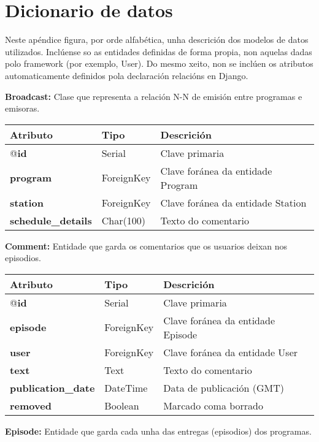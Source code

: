 \chapter[Apéndice: Dicionario de datos]{
  \label{chp:dicionario}
  Dicionario de datos
}
Neste apéndice figura, por orde alfabética, unha descrición dos modelos de datos utilizados. Inclúense so as entidades definidas de forma propia, non aquelas dadas polo framework (por exemplo, User). Do mesmo xeito, non se inclúen os atributos automaticamente definidos pola declaración relacións en Django. 

\textbf{Broadcast:} Clase que representa a relación N-N de emisión entre programas e emisoras.

\begin{longtable}{|p{3cm}|p{3cm}|p{8cm}|}
	\hline
	\rowcolor{gray!50}
	Atributo & Tipo & Descrición\\
	\hline
	@\textbf{id} & Serial & Clave primaria\\
	\hline
	\textbf{program} & ForeignKey & Clave foránea da entidade Program\\
	\hline
	\textbf{station} & ForeignKey & Clave foránea da entidade Station\\	
	\hline
	\textbf{schedule\_details} & Char(100) & Texto do comentario\\
	\hline
\end{longtable}


\textbf{Comment:} Entidade que garda os comentarios que os usuarios deixan nos episodios.

\begin{longtable}{|p{3cm}|p{3cm}|p{8cm}|}
	\hline
	\rowcolor{gray!50}
	Atributo & Tipo & Descrición\\
	\hline
	@\textbf{id} & Serial & Clave primaria\\
	\hline
	\textbf{episode} & ForeignKey & Clave foránea da entidade Episode\\
	\hline
	\textbf{user} & ForeignKey & Clave foránea da entidade User\\	
	\hline
	\textbf{text} & Text & Texto do comentario\\
	\hline
	\textbf{publication\_date} & DateTime & Data de publicación (GMT)\\
	\hline
	\textbf{removed} & Boolean & Marcado coma borrado\\
	\hline
\end{longtable}



\textbf{Episode:} Entidade que garda cada unha das entregas (episodios) dos programas.

